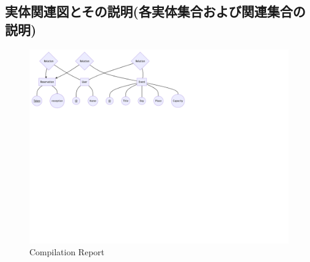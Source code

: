 \documentclass[dvipdfmx]{jarticle}
\begin{document}
\subsection{実体関連図とその説明(各実体集合および関連集合の説明)}

\begin{figure}[H]
    \centering
    \includegraphics[scale=0.5]{ermodel.png}
    \caption{Compilation Report}
\end{figure}
\end{document}
